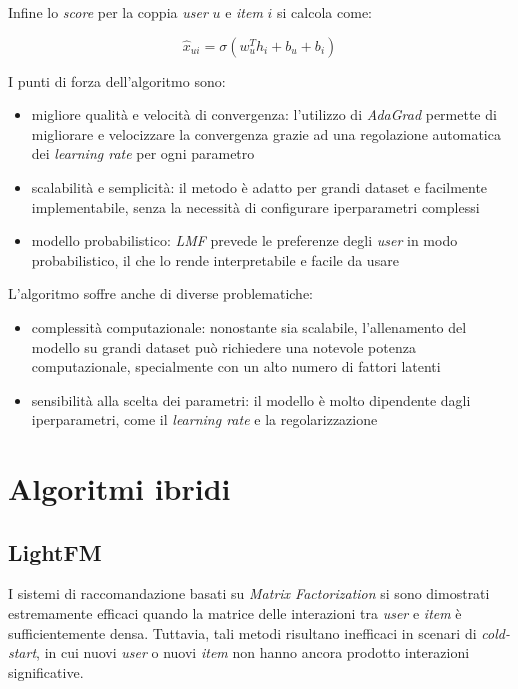 Infine lo \textit{score} per la coppia \textit{user} $u$ e \textit{item} $i$ si calcola come:

\[
\hat{x}_{ui} = \sigma(w_u^T h_i + b_u + b_i)
\]

I punti di forza dell'algoritmo sono:

\begin{itemize}
    \item migliore qualità e velocità di convergenza: l'utilizzo di \textit{AdaGrad} permette di migliorare e velocizzare la convergenza grazie ad una regolazione automatica dei \textit{learning rate} per ogni parametro
    \item scalabilità e semplicità: il metodo è adatto per grandi dataset e facilmente implementabile, senza la necessità di configurare iperparametri complessi
    \item modello probabilistico: \textit{LMF} prevede le preferenze degli \textit{user} in modo probabilistico, il che lo rende interpretabile e facile da usare
\end{itemize}

L'algoritmo soffre anche di diverse problematiche:

\begin{itemize}
    \item complessità computazionale: nonostante sia scalabile, l'allenamento del modello su grandi dataset può richiedere una notevole potenza computazionale, specialmente con un alto numero di fattori latenti
    \item sensibilità alla scelta dei parametri: il modello è molto dipendente dagli iperparametri, come il \textit{learning rate} e la regolarizzazione
\end{itemize}

\section{Algoritmi ibridi}\label{algoritmi-ibridi}

\subsection{LightFM}\label{lightfm}

I sistemi di raccomandazione basati su \textit{Matrix Factorization} si sono dimostrati estremamente efficaci quando la matrice delle interazioni tra \textit{user} e \textit{item} è sufficientemente densa. Tuttavia, tali metodi risultano inefficaci in scenari di \textit{cold-start}, in cui nuovi \textit{user} o nuovi \textit{item} non hanno ancora prodotto interazioni significative.

